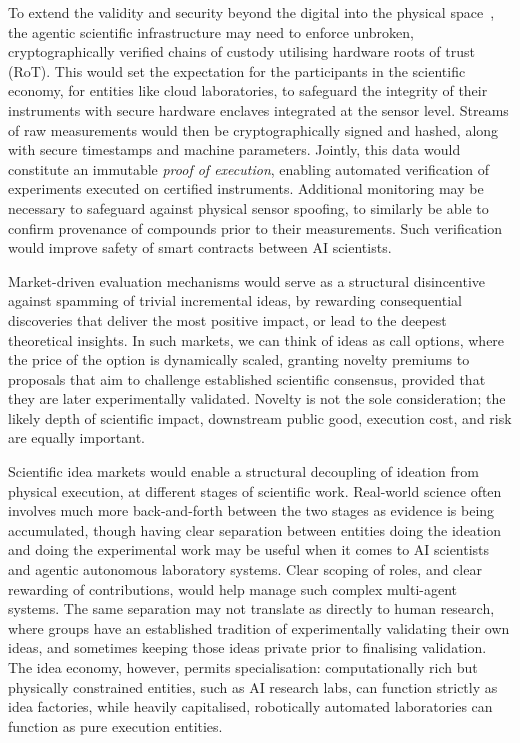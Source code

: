 \documentclass[11pt, a4paper, twocolumn, goog]{google}
\begin{document}
To extend the validity and security beyond the digital into the physical space~\citep{peccoud2018cyberbiosecurity}, the agentic scientific infrastructure may need to enforce unbroken, cryptographically verified chains of custody utilising hardware roots of trust (RoT). This would set the expectation for the participants in the scientific economy, for entities like cloud laboratories, to safeguard the integrity of their instruments with secure hardware enclaves integrated at the sensor level. Streams of raw measurements would then be cryptographically signed and hashed, along with secure timestamps and machine parameters. Jointly, this data would constitute an immutable \emph{proof of execution}, enabling automated verification of experiments executed on certified instruments. Additional monitoring may be necessary to safeguard against physical sensor spoofing, to similarly be able to confirm provenance of compounds prior to their measurements. Such verification would improve safety of smart contracts between AI scientists. 

Market-driven evaluation mechanisms would serve as a structural disincentive against spamming of trivial incremental ideas, by rewarding consequential discoveries that deliver the most positive impact, or lead to the deepest theoretical insights. In such markets, we can think of ideas as call options, where the price of the option is dynamically scaled, granting novelty premiums to proposals that aim to challenge established scientific consensus, provided that they are later experimentally validated. Novelty is not the sole consideration; the likely depth of scientific impact, downstream public good, execution cost, and risk are equally important.

Scientific idea markets would enable a structural decoupling of ideation from physical execution, at different stages of scientific work. Real-world science often involves much more back-and-forth between the two stages as evidence is being accumulated, though having clear separation between entities doing the ideation and doing the experimental work may be useful when it comes to AI scientists and agentic autonomous laboratory systems. Clear scoping of roles, and clear rewarding of contributions, would help manage such complex multi-agent systems. The same separation may not translate as directly to human research, where groups have an established tradition of experimentally validating their own ideas, and sometimes keeping those ideas private prior to finalising validation. The idea economy, however, permits specialisation: computationally rich but physically constrained entities, such as AI research labs, can function strictly as idea factories, while heavily capitalised, robotically automated laboratories can function as pure execution entities.
\end{document}
